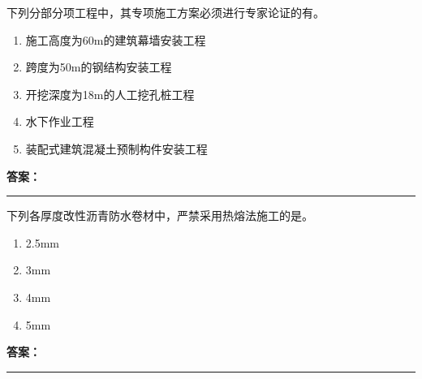 \documentclass[UTF8,fontset=fandol,11pt]{ctexart}
\newcommand{\answerline}{\textcolor{answerred}{\rule{2.4cm}{0.7pt}}}
\begin{document}
\vspace{0.2em}

\begin{quizbox}[title={乱序第 257 题｜第七章脚手架工程}]

下列分部分项工程中，其专项施工方案必须进行专家论证的有。\\

\begin{enumerate}[label=\Alph*.]

\item 施工高度为60m的建筑幕墙安装工程

\item 跨度为50m的钢结构安装工程

\item 开挖深度为18m的人工挖孔桩工程

\item 水下作业工程

\item 装配式建筑混凝土预制构件安装工程

\end{enumerate}

\textbf{\textcolor{answerred}{答案：}} \answerline

\end{quizbox}

\vspace{0.2em}

\begin{quizbox}[title={乱序第 258 题｜第九章防水工程}]

下列各厚度改性沥青防水卷材中，严禁采用热熔法施工的是。\\

\begin{enumerate}[label=\Alph*.]

\item 2.5mm

\item 3mm

\item 4mm

\item 5mm

\end{enumerate}

\textbf{\textcolor{answerred}{答案：}} \answerline

\end{quizbox}

\vspace{0.2em}
\end{document}
